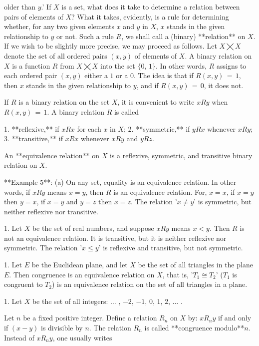 older than \(y\).' If \(X\) is a set, what does it take to determine a relation between pairs of elements of \(X\)? What it takes, evidently, is a rule for determining whether, for any two given elements \(x\) and \(y\) in \(X\), \(x\) stands in the given relationship to \(y\) or not. Such a rule \(R\), we shall call a (binary) **relation** on \(X\). If we wish to be slightly more precise, we may proceed as follows. Let \(X\bigtimes X\) denote the set of all ordered pairs \((x,y)\) of elements of \(X\). A binary relation on \(X\) is a function \(R\) from \(X\bigtimes X\) into the set \(\{0,\,1\}\). In other words, \(R\) assigns to each ordered pair \((x,y)\) either a \(1\) or a \(0\). The idea is that if \(R(x,y)\,=\,1\), then \(x\) stands in the given relationship to \(y\), and if \(R(x,y)\,=\,0\), it does not.

If \(R\) is a binary relation on the set \(X\), it is convenient to write \(xRy\) when \(R(x,y)\,=\,1\). A binary relation \(R\) is called

1. **reflexive,** if \(xRx\) for each \(x\) in \(X\);
2. **symmetric,** if \(yRx\) whenever \(xRy\);
3. **transitive,** if \(xRx\) whenever \(xRy\) and \(yRz\).

An **equivalence relation** on \(X\) is a reflexive, symmetric, and transitive binary relation on \(X\).

**Example 5**: (a) On any set, equality is an equivalence relation. In other words, if \(xRy\) means \(x=y\), then \(R\) is an equivalence relation. For, \(x=x\), if \(x=y\) then \(y=x\), if \(x=y\) and \(y=z\) then \(x=z\). The relation '\(x\neq y\)' is symmetric, but neither reflexive nor transitive.

1. Let \(X\) be the set of real numbers, and suppose \(xRy\) means \(x<y\). Then \(R\) is not an equivalence relation. It is transitive, but it is neither reflexive nor symmetric. The relation '\(x\leq y\)' is reflexive and transitive, but not symmetric.

1. Let \(E\) be the Euclidean plane, and let \(X\) be the set of all triangles in the plane \(E\). Then congruence is an equivalence relation on \(X\), that is, '\(T_{1}\cong T_{2}\)' (\(T_{1}\) is congruent to \(T_{2}\)) is an equivalence relation on the set of all triangles in a plane.

1. Let \(X\) be the set of all integers: \(\ldots\) , \(-2\), \(-1\), \(0\), \(1\), \(2\), \(\ldots\) .

Let \(n\) be a fixed positive integer. Define a relation \(R_{n}\) on \(X\) by: \(xR_{n}y\) if and only if \((x-y)\) is divisible by \(n\). The relation \(R_{n}\) is called **congruence modulo**\(n\). Instead of \(xR_{n}y\), one usually writes


